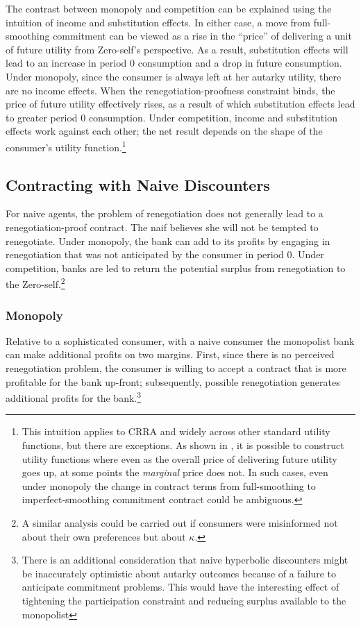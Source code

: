 \documentclass[11pt,english]{article}
\theoremstyle{plain}
\theoremstyle{definition}
\begin{document}
The contrast between monopoly and competition can be explained using
the intuition of income and substitution effects. In either case,
a move from full-smoothing commitment can be viewed as a rise in the
``price'' of delivering a unit of future utility from Zero-self's
perspective. As a result, substitution effects will lead to an increase
in period 0 consumption and a drop in future consumption. Under monopoly,
since the consumer is always left at her autarky utility, there are
no income effects. When the renegotiation-proofness constraint binds,
the price of future utility effectively rises, as a result of which
substitution effects lead to greater period 0 consumption. Under competition,
income and substitution effects work against each other; the net result
depends on the shape of the consumer's utility function.\footnote{This intuition applies to CRRA and widely across other standard utility
functions, but there are exceptions. As shown in \citet{basu2020},
it is possible to construct utility functions where even as the overall
price of delivering future utility goes up, at some points the \emph{marginal}
price does not. In such cases, even under monopoly the change in contract
terms from full-smoothing to imperfect-smoothing commitment contract
could be ambiguous.}

\subsection{Contracting with Naive Discounters}

For naive agents, the problem of renegotiation does not generally
lead to a renegotiation-proof contract. The naif believes she will
not be tempted to renegotiate.  Under monopoly, the
bank can add to its profits by engaging in renegotiation that was not
anticipated by the consumer in period 0. Under competition, banks
are led to return the potential surplus from renegotiation to the Zero-self.\footnote{A similar analysis could be carried out if consumers were misinformed
not about their own preferences but about $\kappa$.}

\subsubsection{Monopoly}

Relative to a sophisticated consumer, with a naive consumer the monopolist
bank can make additional profits on two margins. First, since there
is no perceived renegotiation problem, the consumer is willing to
accept a contract that is more profitable for the bank up-front; subsequently,
possible renegotiation generates additional profits for the bank.\footnote{There is an additional consideration \textendash{} that naive hyperbolic
discounters might be inaccurately optimistic about autarky outcomes
because of a failure to anticipate commitment problems. This would
have the interesting effect of tightening the participation constraint
and reducing surplus available to the monopolist}
\end{document}
